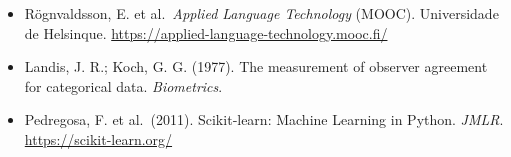 \documentclass[
  brazilian,
  11pt,
]{article}
\providecommand{\tightlist}{%
  \setlength{\itemsep}{0pt}\setlength{\parskip}{0pt}}
\begin{document}
\begin{itemize}
\tightlist
\item
  Rögnvaldsson, E. et al.~\emph{Applied Language Technology} (MOOC).
  Universidade de Helsinque.
  \url{https://applied-language-technology.mooc.fi/}
\item
  Landis, J. R.; Koch, G. G. (1977). The measurement of observer
  agreement for categorical data. \emph{Biometrics}.
\item
  Pedregosa, F. et al.~(2011). Scikit‑learn: Machine Learning in Python.
  \emph{JMLR}. \url{https://scikit-learn.org/}
\end{itemize}
\end{document}
